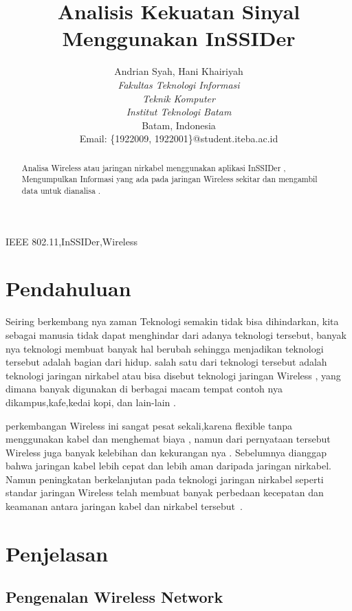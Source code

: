 \documentclass[conference]{IEEEtran}
\title{Analisis Kekuatan Sinyal Menggunakan InSSIDer}
\author{Andrian Syah\IEEEauthorrefmark{1}, Hani Khairiyah\IEEEauthorrefmark{2}\\
\textit{Fakultas Teknologi Informasi}\\
\textit{Teknik Komputer}\\
\textit{Institut Teknologi Batam}\\
Batam, Indonesia\\
Email: \{\IEEEauthorrefmark{1}1922009, \IEEEauthorrefmark{2}1922001\}@student.iteba.ac.id}
\begin{document}
\maketitle

\begin{abstract}
    Analisa Wireless atau jaringan nirkabel menggunakan aplikasi InSSIDer ,
    Mengumpulkan Informasi yang ada pada jaringan Wireless sekitar dan mengambil data 
    untuk dianalisa .
\end{abstract}

\begin{IEEEkeywords}
    IEEE 802.11,InSSIDer,Wireless
\end{IEEEkeywords}

\section{Pendahuluan}
Seiring berkembang nya zaman Teknologi semakin tidak bisa dihindarkan, 
kita sebagai manusia tidak dapat menghindar dari adanya teknologi tersebut,
banyak nya teknologi membuat banyak hal berubah sehingga menjadikan teknologi tersebut 
adalah bagian dari hidup. salah satu dari teknologi tersebut adalah teknologi jaringan nirkabel
atau bisa disebut teknologi jaringan Wireless , yang dimana banyak digunakan di berbagai macam tempat 
contoh nya dikampus,kafe,kedai kopi, dan lain-lain .

perkembangan Wireless ini sangat pesat sekali,karena flexible tanpa menggunakan kabel dan menghemat biaya 
, namun dari pernyataan tersebut Wireless juga banyak kelebihan dan kekurangan nya . 
Sebelumnya dianggap bahwa jaringan kabel lebih cepat dan lebih aman daripada jaringan nirkabel.
Namun peningkatan berkelanjutan pada teknologi jaringan nirkabel seperti standar jaringan Wireless
 telah membuat banyak perbedaan kecepatan dan keamanan antara jaringan kabel dan nirkabel tersebut~.\cite{puspitasari2014analisis}

\section{Penjelasan}
\subsection{Pengenalan Wireless Network}
\end{document}
